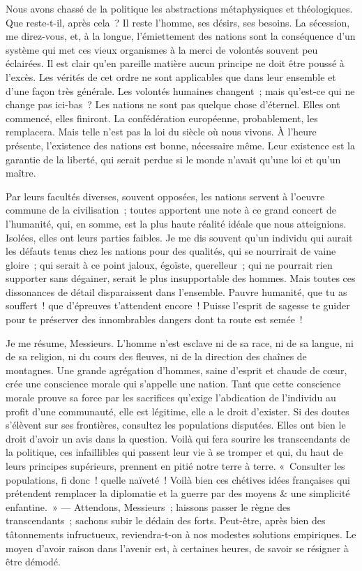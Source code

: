 \documentclass[french,twoside]{book} %
\newcommand\chapterclose{} %
\begin{document}
Nous avons chassé de la politique les abstractions métaphysiques et théologiques. Que reste-t-il, après cela ? Il reste l’homme, ses désirs, ses besoins. La sécession, me direz-vous, et, à la longue, l’émiettement des nations sont la conséquence d’un système qui met ces vieux organismes à la merci de volontés souvent peu éclairées. Il est clair qu’en pareille matière aucun principe ne doit être poussé à l’excès. Les vérités de cet ordre ne sont applicables que dans leur ensemble et d’une façon très générale. Les volontés humaines changent ; mais qu’est-ce qui ne change pas ici-bas ? Les nations ne sont pas quelque chose d’éternel. Elles ont commencé, elles finiront. La confédération européenne, probablement, les remplacera. Mais telle n’est pas la loi du siècle où nous vivons. À l’heure présente, l’existence des nations est bonne, nécessaire même. Leur existence est la garantie de la liberté, qui serait perdue si le monde n’avait qu’une loi et qu’un maître.\par
Par leurs facultés diverses, souvent opposées, les nations servent à l’oeuvre commune de la civilisation ; toutes apportent une note à ce grand concert de l’humanité, qui, en somme, est la plus haute réalité idéale que nous atteignions. Isolées, elles ont leurs parties faibles. Je me dis souvent qu’un individu qui aurait les défauts tenus chez les nations pour des qualités, qui se nourrirait de vaine gloire ; qui serait à ce point jaloux, égoïste, querelleur ; qui ne pourrait rien supporter sans dégainer, serait le plus insupportable des hommes. Mais toutes ces dissonances de détail disparaissent dans l’ensemble. Pauvre humanité, que tu as souffert ! que d’épreuves t’attendent encore ! Puisse l’esprit de sagesse te guider pour te préserver des innombrables dangers dont ta route est semée !\par
Je me résume, Messieurs. L’homme n’est esclave ni de sa race, ni de sa langue, ni de sa religion, ni du cours des fleuves, ni de la direction des chaînes de montagnes. Une grande agrégation d’hommes, saine d’esprit et chaude de cœur, crée une conscience morale qui s’appelle une nation. Tant que cette conscience morale prouve sa force par les sacrifices qu’exige l’abdication de l’individu au profit d’une communauté, elle est légitime, elle a le droit d’exister. Si des doutes s’élèvent sur ses frontières, consultez les populations disputées. Elles ont bien le droit d’avoir un avis dans la question. Voilà qui fera sourire les transcendants de la politique, ces infaillibles qui passent leur vie à se tromper et qui, du haut de leurs principes supérieurs, prennent en pitié notre terre à terre. « Consulter les populations, fi donc ! quelle naïveté ! Voilà bien ces chétives idées françaises qui prétendent remplacer la diplomatie et la guerre par des moyens \& une simplicité enfantine. » — Attendons, Messieurs ; laissons passer le règne des transcendants ; sachons subir le dédain des forts. Peut-être, après bien des tâtonnements infructueux, reviendra-t-on à nos modestes solutions empiriques. Le moyen d’avoir raison dans l’avenir est, à certaines heures, de savoir se résigner à être démodé.
\chapterclose
\end{document}
